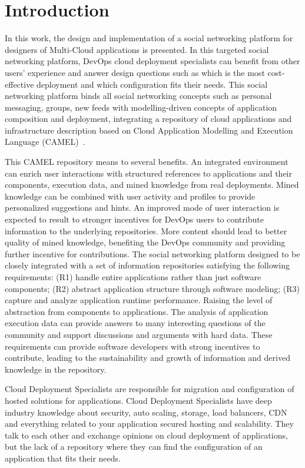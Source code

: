 \chapter{Introduction}
In this work, the design and implementation of a social networking platform for designers of Multi-Cloud applications is presented. In this targeted social networking platform, DevOps cloud deployment specialists can benefit from other users' experience and answer design questions such as which is the most cost-effective deployment and which configuration fits their needs. This social networking platform binds all social networking concepts such as personal messaging, groups, new feeds with modelling-driven concepts of application composition and deployment, integrating a repository of cloud applications and infrastructure description based on Cloud Application Modelling and Execution Language (CAMEL)~\cite{paasagedeliverable212}. 

This CAMEL repository means to several benefits. 
An integrated environment can enrich user interactions with structured references to applications and their components, execution data, and mined knowledge from real deployments. Mined knowledge can be combined with user activity and profiles to provide personalized suggestions and hints.  An improved mode of user interaction is expected to result to stronger incentives for DevOps users to contribute information to the underlying repositories. More content should lead to better quality of mined knowledge, benefiting the DevOps community and providing further incentive for contributions.  The social networking platform designed to be closely integrated with a set of information repositories satisfying the following requirements: 
(R1) handle entire applications rather than just software components; (R2) abstract application structure through software modeling; (R3) capture and analyze application runtime performance. Raising the level of abstraction from components to applications. The analysis of application execution data can provide answers to many interesting questions of the community and support discussions and arguments with hard data. 
These requirements can provide software developers with strong incentives to contribute, leading to the sustainability and growth of information and derived knowledge in the repository.

Cloud Deployment Specialists are responsible for migration and configuration of hosted solutions for applications. Cloud Deployment Specialists have deep industry knowledge about security, auto scaling, storage, load balancers, CDN and everything related to your application secured hosting and scalability. They talk to each other and exchange opinions on cloud deployment of applications, but the lack of a repository where they can find the configuration of an application that fits their needs. 


